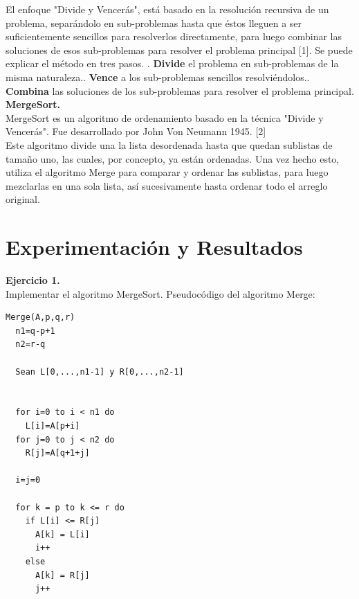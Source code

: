 \documentclass[12pt]{report}
\begin{document}
		El enfoque "Divide y Vencerás", está basado en la resolución recursiva de un problema, separándolo en sub-problemas hasta que éstos lleguen  a ser suficientemente sencillos para resolverlos directamente, para luego combinar las soluciones de esos sub-problemas para resolver el problema principal [1]. Se puede explicar el método en tres pasos. \newline {}. \textbf{Divide} el problema en sub-problemas de la misma naturaleza.. \textbf{Vence} a los sub-problemas sencillos resolviéndolos.. \textbf{Combina} las soluciones de los sub-problemas para resolver el problema principal.\\
		
	\textbf{MergeSort.}\\
	
	MergeSort es un algoritmo de ordenamiento basado en la técnica "Divide y Vencerás". Fue desarrollado por John Von Neumann 1945. [2]\\
	Este algoritmo divide una la lista desordenada hasta que quedan sublistas de tamaño uno, las cuales, por concepto, ya están ordenadas. Una vez hecho esto, utiliza el algoritmo Merge para comparar y ordenar las sublistas, para luego mezclarlas en una sola lista, así sucesivamente hasta ordenar todo el arreglo original.
	
	\section{Experimentación y Resultados}	
	\textbf{Ejercicio 1.}\\
	Implementar el algoritmo MergeSort.\newline \newline
	Pseudocódigo del algoritmo Merge:
	\lstset{language=C, breaklines=true, basicstyle=\footnotesize}
	\lstset{numbers=left, numberstyle=\tiny, stepnumber=1, numbersep=10pt}
	\begin{lstlisting}
Merge(A,p,q,r)
  n1=q-p+1
  n2=r-q
  
  Sean L[0,...,n1-1] y R[0,...,n2-1]
  
  
  for i=0 to i < n1 do
    L[i]=A[p+i]
  for j=0 to j < n2 do
    R[j]=A[q+1+j]
   
  i=j=0
  
  for k = p to k <= r do
    if L[i] <= R[j]
      A[k] = L[i]
      i++
    else 
      A[k] = R[j]
      j++
      
	\end{lstlisting}
	
\end{document}
